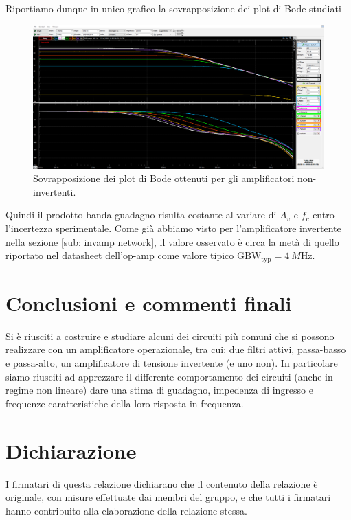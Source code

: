 \documentclass[10pt, a4paper, italian]{article}
\begin{document}
Riportiamo dunque in unico grafico la sovrapposizione dei plot di Bode studiati
\begin{figure}[htbp]
\centering
\includegraphics[scale=0.335]{ampbode}
\caption{Sovrapposizione dei plot di Bode ottenuti per gli amplificatori
non-invertenti. \label{fig: ampbode}}
\end{figure}

Quindi il prodotto banda-guadagno risulta costante al variare di $A_v$ e $f_c$
entro l’incertezza sperimentale. Come già abbiamo visto per l'amplificatore
invertente nella sezione \ref{sub: invamp network}, il valore osservato è
circa la metà di quello riportato nel datasheet dell’op-amp come valore
tipico $\mathrm{GBW_{typ}} = \SI{4}{M\Hz}$.

\section*{Conclusioni e commenti finali}
Si è riusciti a costruire e studiare alcuni dei circuiti più comuni che si
possono realizzare con un amplificatore operazionale, tra cui: due filtri
attivi, passa-basso e passa-alto, un amplificatore di tensione invertente
(e uno non).
In particolare siamo riusciti ad apprezzare il differente comportamento dei
circuiti (anche in regime non lineare) dare una stima di guadagno, impedenza di
ingresso e frequenze caratteristiche della loro risposta in frequenza.

\section*{Dichiarazione}
I firmatari di questa relazione dichiarano che il contenuto della relazione \`e
originale, con misure effettuate dai membri del gruppo, e che tutti i firmatari
hanno contribuito alla elaborazione della relazione stessa.
\end{document}
